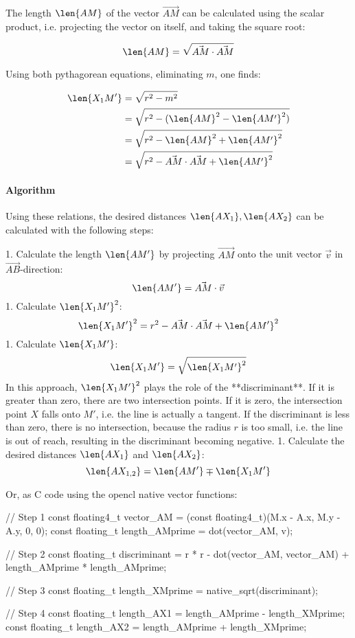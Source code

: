 The length $\len{AM}$ of the vector $\vec{AM}$ can be calculated using the scalar product, i.e. projecting the vector on itself, and taking the square root:

\begin{equation} \len{AM} = \sqrt{\vec{AM} \cdot \vec{AM}} \end{equation}

Using both pythagorean equations, eliminating $m$, one finds:

\begin{equation}\begin{split}
  \len{X_1 M'} &= \sqrt{r^2 - m^2} \\
    &= \sqrt{r^2 - (\len{AM}^2 - \len{AM'}^2)} \\
    &= \sqrt{r^2 - \len{AM}^2 + \len{AM'}^2} \\
    &= \sqrt{r^2 - \vec{AM} \cdot \vec{AM} + \len{AM'}^2}
\end{split}\end{equation}

\paragraph{Algorithm} Using these relations, the desired distances $\len{AX_1}, \len{AX_2}$ can be calculated with the following steps:

1. Calculate the length $\len{AM'}$ by projecting $\vec{AM}$ onto the unit vector $\vec{v}$ in $\vec{AB}$-direction: $$ \len{AM'} = \vec{AM} \cdot \vec{v} $$
1. Calculate $\len{X_1M'}^2$: $$ \len{X_1 M'}^2 = r^2 - \vec{AM} \cdot \vec{AM} + \len{AM'}^2 $$
1. Calculate $\len{X_1M'}$: $$ \len{X_1 M'} = \sqrt{\len{X_1 M'}^2} $$ In this approach, $\len{X_1M'}^2$ plays the role of the **discriminant**. If it is greater than zero, there are two intersection points. If it is zero, the intersection point $X$ falls onto $M'$, i.e. the line is actually a tangent. If the discriminant is less than zero, there is no intersection, because the radius $r$ is too small, i.e. the line is out of reach, resulting in the discriminant becoming negative.
1. Calculate the desired distances $\len{AX_1}$ and $\len{AX_2}$: $$ \len{A X_{1,2}} = \len{A M'} \mp \len{X_1 M'} $$

Or, as C code using the opencl native vector functions:

\begin{ccode}
  // Step 1
  const floating4_t vector_AM = (const floating4_t)(M.x - A.x, M.y - A.y, 0, 0);
  const floating_t length_AMprime = dot(vector_AM, v);

  // Step 2
  const floating_t discriminant = r * r - dot(vector_AM, vector_AM) + length_AMprime * length_AMprime;

  // Step 3
  const floating_t length_XMprime = native_sqrt(discriminant);

  // Step 4
  const floating_t length_AX1 = length_AMprime - length_XMprime;
  const floating_t length_AX2 = length_AMprime + length_XMprime;
\end{ccode}


